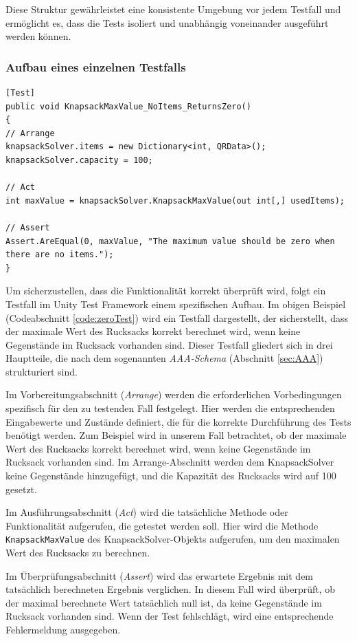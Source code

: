 Diese Struktur gewährleistet eine konsistente Umgebung vor jedem Testfall und ermöglicht es, dass die Tests isoliert und unabhängig voneinander ausgeführt werden können.


\subsubsection{Aufbau eines einzelnen Testfalls}

\begin{lstlisting}[style=csharp, caption={einzelner Testfall}, label={code:zeroTest}]
[Test]
public void KnapsackMaxValue_NoItems_ReturnsZero()
{
// Arrange
knapsackSolver.items = new Dictionary<int, QRData>();
knapsackSolver.capacity = 100;

// Act
int maxValue = knapsackSolver.KnapsackMaxValue(out int[,] usedItems);

// Assert
Assert.AreEqual(0, maxValue, "The maximum value should be zero when there are no items.");
}
\end{lstlisting}

Um sicherzustellen, dass die Funktionalität korrekt überprüft wird, folgt ein Testfall im Unity Test Framework einem spezifischen Aufbau. Im obigen Beispiel (Codeabschnitt \ref{code:zeroTest}) wird ein Testfall dargestellt, der sicherstellt, dass der maximale Wert des Rucksacks korrekt berechnet wird, wenn keine Gegenstände im Rucksack vorhanden sind. Dieser Testfall gliedert sich in drei Hauptteile, die nach dem sogenannten \textit{AAA-Schema} (Abschnitt \ref{sec:AAA}) strukturiert sind.

Im Vorbereitungsabschnitt (\textit{Arrange}) werden die erforderlichen Vorbedingungen spezifisch für den zu testenden Fall festgelegt. Hier werden die entsprechenden Eingabewerte und Zustände definiert, die für die korrekte Durchführung des Tests benötigt werden. Zum Beispiel wird in unserem Fall betrachtet, ob der maximale Wert des Rucksacks korrekt berechnet wird, wenn keine Gegenstände im Rucksack vorhanden sind. Im Arrange-Abschnitt werden dem KnapsackSolver keine Gegenstände hinzugefügt, und die Kapazität des Rucksacks wird auf 100 gesetzt.

Im Ausführungsabschnitt (\textit{Act}) wird die tatsächliche Methode oder Funktionalität aufgerufen, die getestet werden soll. Hier wird die Methode \texttt{KnapsackMaxValue} des KnapsackSolver-Objekts aufgerufen, um den maximalen Wert des Rucksacks zu berechnen.

Im Überprüfungsabschnitt (\textit{Assert}) wird das erwartete Ergebnis mit dem tatsächlich berechneten Ergebnis verglichen. In diesem Fall wird überprüft, ob der maximal berechnete Wert tatsächlich null ist, da keine Gegenstände im Rucksack vorhanden sind. Wenn der Test fehlschlägt, wird eine entsprechende Fehlermeldung ausgegeben.

